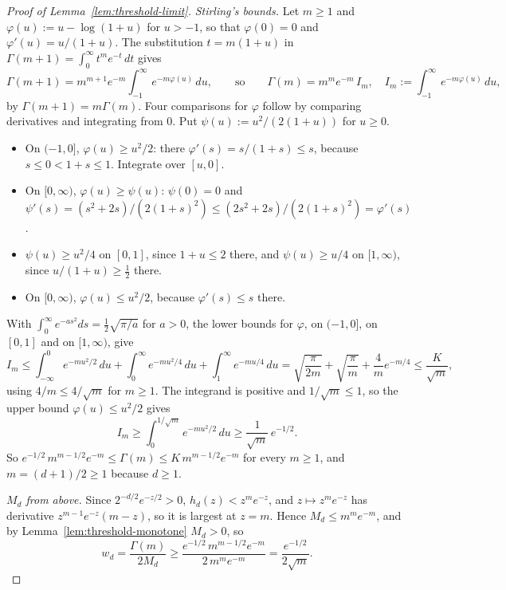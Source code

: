 \begin{proof}[Proof of Lemma~\ref{lem:threshold-limit}]
\emph{Stirling's bounds.} Let $m \ge 1$ and $\varphi(u) := u - \log(1+u)$ for $u > -1$, so that
$\varphi(0) = 0$ and $\varphi'(u) = u/(1+u)$. The substitution $t = m(1+u)$ in
$\Gamma(m+1) = \int_0^\infty t^m e^{-t}\,dt$ gives
\[
  \Gamma(m+1) = m^{m+1}e^{-m}\int_{-1}^\infty e^{-m\varphi(u)}\,du ,
  \qquad\text{so}\qquad
  \Gamma(m) = m^m e^{-m}\,I_m ,\quad I_m := \int_{-1}^\infty e^{-m\varphi(u)}\,du ,
\]
by $\Gamma(m+1) = m\Gamma(m)$. Four comparisons for $\varphi$ follow by comparing derivatives and
integrating from $0$. Put $\psi(u) := u^2/(2(1+u))$ for $u \ge 0$.
\begin{itemize}
\item On $(-1,0]$, $\varphi(u) \ge u^2/2$: there $\varphi'(s) = s/(1+s) \le s$, because
$s \le 0 < 1+s \le 1$. Integrate over $[u,0]$.
\item On $[0,\infty)$, $\varphi(u) \ge \psi(u)$: $\psi(0) = 0$ and
$\psi'(s) = (s^2+2s)/(2(1+s)^2) \le (2s^2+2s)/(2(1+s)^2) = \varphi'(s)$.
\item $\psi(u) \ge u^2/4$ on $[0,1]$, since $1+u \le 2$ there, and $\psi(u) \ge u/4$ on
$[1,\infty)$, since $u/(1+u) \ge \tfrac12$ there.
\item On $[0,\infty)$, $\varphi(u) \le u^2/2$, because $\varphi'(s) \le s$ there.
\end{itemize}
With $\int_0^\infty e^{-as^2}ds = \tfrac12\sqrt{\pi/a}$ for $a > 0$, the lower bounds for
$\varphi$, on $(-1,0]$, on $[0,1]$ and on $[1,\infty)$, give
\[
  I_m \le \int_{-\infty}^0 e^{-mu^2/2}\,du + \int_0^\infty e^{-mu^2/4}\,du
   + \int_1^\infty e^{-mu/4}\,du
  = \sqrt{\frac{\pi}{2m}} + \sqrt{\frac{\pi}{m}} + \frac4m e^{-m/4}
  \le \frac{K}{\sqrt m} ,
\]
using $4/m \le 4/\sqrt m$ for $m \ge 1$. The integrand is positive and $1/\sqrt m \le 1$, so the
upper bound $\varphi(u) \le u^2/2$ gives
\[
  I_m \ge \int_0^{1/\sqrt m} e^{-mu^2/2}\,du \ge \frac{1}{\sqrt m}\,e^{-1/2} .
\]
So $e^{-1/2}\,m^{m-1/2}e^{-m} \le \Gamma(m) \le K\,m^{m-1/2}e^{-m}$ for every $m \ge 1$, and
$m = (d+1)/2 \ge 1$ because $d \ge 1$.

\emph{$M_d$ from above.} Since $2^{-d/2}e^{-z/2} > 0$, $h_d(z) < z^m e^{-z}$, and
$z \mapsto z^m e^{-z}$ has derivative $z^{m-1}e^{-z}(m - z)$, so it is largest at $z = m$. Hence
$M_d \le m^m e^{-m}$, and by Lemma~\ref{lem:threshold-monotone} $M_d > 0$, so
\[
  w_d = \frac{\Gamma(m)}{2M_d} \ge \frac{e^{-1/2}\,m^{m-1/2}e^{-m}}{2\,m^m e^{-m}}
   = \frac{e^{-1/2}}{2\sqrt m} .
\]


\end{proof}
